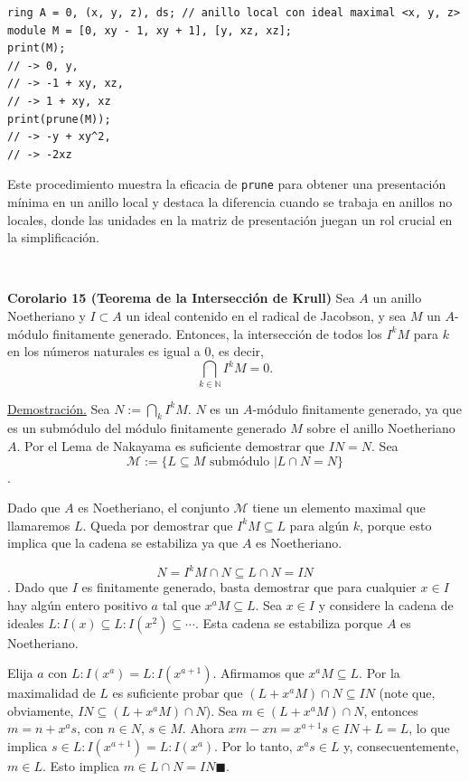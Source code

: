 \documentclass[10pt,a4paper]{article}
\begin{document}
\begin{enumerate}[label=(\alph*)]
\begin{verbatim}
ring A = 0, (x, y, z), ds; // anillo local con ideal maximal <x, y, z>
module M = [0, xy - 1, xy + 1], [y, xz, xz];
print(M);
// -> 0, y,
// -> -1 + xy, xz,
// -> 1 + xy, xz
print(prune(M));
// -> -y + xy^2,
// -> -2xz
\end{verbatim}

Este procedimiento muestra la eficacia de \texttt{prune} para obtener una presentación mínima en un anillo local y destaca la diferencia cuando se trabaja en anillos no locales, donde las unidades en la matriz de presentación juegan un rol crucial en la simplificación.

\

\textbf{Corolario 15 (Teorema de la Intersección de Krull)}
Sea \( A \) un anillo Noetheriano y \( I \subset A \) un ideal contenido en el radical de Jacobson, y sea \( M \) un \( A \)-módulo finitamente generado. Entonces, la intersección de todos los \( I^k M \) para \( k \) en los números naturales es igual a \( 0 \), es decir,
\[ \bigcap_{k \in \mathbb{N}} I^k M = 0. \]

\underline{Demostración.} Sea \( N := \bigcap_{k} I^k M \). \( N \) es un \( A \)-módulo finitamente generado, ya que es un submódulo del módulo finitamente generado \( M \) sobre el anillo Noetheriano \( A \). Por el Lema de Nakayama es suficiente demostrar que \( IN = N \). Sea
\[ \mathcal{M} := \{ L \subseteq M \text{ submódulo } | L \cap N = N \} \].

Dado que \( A \) es Noetheriano, el conjunto \( \mathcal{M} \) tiene un elemento maximal que llamaremos \( L \). Queda por demostrar que \( I^k M \subseteq L \) para algún \( k \), porque esto implica que la cadena se estabiliza ya que \( A \) es Noetheriano.

\[ N = I^k M \cap N \subseteq L \cap N = IN \]. Dado que \( I \) es finitamente generado, basta demostrar que para cualquier \( x \in I \) hay algún entero positivo \( a \) tal que \( x^a M \subseteq L \). Sea \( x \in I \) y considere la cadena de ideales \( L : I (x) \subseteq L : I (x^2) \subseteq \cdots \). Esta cadena se estabiliza porque \( A \) es Noetheriano.

Elija \( a \) con \( L : I (x^a) = L : I (x^{a+1}) \). Afirmamos que \( x^a M \subseteq L \). Por la maximalidad de \( L \) es suficiente probar que \( (L + x^a M) \cap N \subseteq IN \) (note que, obviamente, \( IN \subseteq (L + x^a M) \cap N \)). Sea \( m \in (L + x^a M) \cap N \), entonces \( m = n + x^a s \), con \( n \in N \), \( s \in M \). Ahora \( xm - xn = x^{a+1} s \in IN + L = L \), lo que implica \( s \in L : I (x^{a+1}) = L : I (x^a) \). Por lo tanto, \( x^a s \in L \) y, consecuentemente, \( m \in L \). Esto implica \( m \in L \cap N = IN \blacksquare \). 



\end{enumerate}
\end{document}
